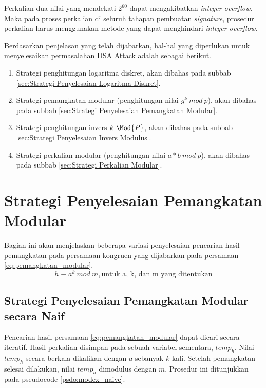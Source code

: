 Perkalian dua nilai yang mendekati $2^{60}$ dapat mengakibatkan \textit{integer overflow}. Maka pada proses perkalian di seluruh tahapan pembuatan \textit{signature}, prosedur perkalian harus menggunakan metode yang dapat menghindari \textit{integer overflow}.

Berdasarkan penjelasan yang telah dijabarkan, hal-hal yang diperlukan untuk menyelesaikan permasalahan DSA Attack adalah sebagai berikut.

\begin{enumerate}
	\item Strategi penghitungan logaritma diskret, akan dibahas pada subbab \ref{sec:Strategi Penyelesaian Logaritma Diskret}.
	\item Strategi pemangkatan modular (penghitungan nilai $ g^k\ mod\ p $), akan dibahas pada subbab \ref{sec:Strategi Penyelesaian Pemangkatan Modular}.
	\item Strategi penghitungan invers $ k\ \Mod{P} $, akan dibahas pada subbab \ref {sec:Strategi Penyelesaian Invers Modulus}.
	\item Strategi perkalian modular (penghitungan nilai $ a * b\ mod\ p $), akan dibahas pada subbab \ref{sec:Strategi Perkalian Modular}.
\end{enumerate}

\section{ Strategi Penyelesaian Pemangkatan Modular}
Bagian ini akan menjelaskan beberapa variasi penyelesaian pencarian hasil pemangkatan pada persamaan kongruen yang dijabarkan pada persamaan \eqref{eq:pemangkatan_modular}.
\begin{equation}
h \equiv a^k\ mod\ m,\text{untuk a, k, dan m yang ditentukan}
\label{eq:pemangkatan_modular}
\end{equation}

\subsection{ Strategi Penyelesaian Pemangkatan Modular secara Naif}
Pencarian hasil persamaan \eqref{eq:pemangkatan_modular} dapat dicari secara iteratif. Hasil perkalian disimpan pada sebuah variabel sementara, $temp_h$. Nilai $temp_h$ secara berkala dikalikan dengan $a$ sebanyak $k$ kali. Setelah pemangkatan selesai dilakukan, nilai $temp_h$ dimodulus dengan $ m $. Prosedur ini ditunjukkan pada pseudocode \ref{psdo:modex_naive}.

